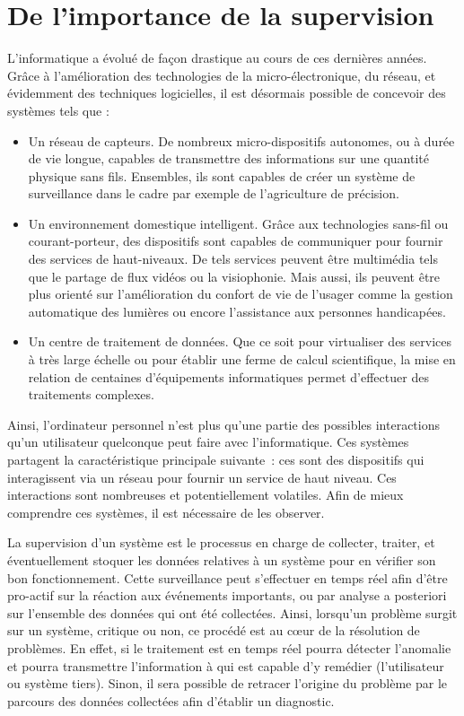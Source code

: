 \section{De l'importance de la supervision}\label{sec:intro:contexte}

L'informatique a évolué de façon drastique au cours de ces dernières années. Grâce à l'amélioration des technologies de la micro-électronique, du réseau, et évidemment des techniques logicielles, il est désormais possible de concevoir des systèmes tels que :
\begin{itemize}
 \item Un réseau de capteurs. De nombreux micro-dispositifs autonomes, ou à durée de vie longue, capables de transmettre des informations sur une quantité physique sans fils. Ensembles, ils sont capables de créer un système de surveillance dans le cadre par exemple de l'agriculture de précision.
 \item Un environnement domestique intelligent. Grâce aux technologies sans-fil ou courant-porteur, des dispositifs sont capables de communiquer pour fournir des services de haut-niveaux. De tels services peuvent être  multimédia tels que le partage de flux vidéos ou la visiophonie. Mais aussi, ils peuvent être plus orienté sur l'amélioration du confort de vie de l'usager comme la gestion automatique des lumières ou encore l'assistance aux personnes handicapées.
 \item Un centre de traitement de données. Que ce soit pour virtualiser des services à très large échelle ou pour établir une ferme de calcul scientifique, la mise en relation de centaines d'équipements informatiques permet d'effectuer des traitements complexes.
\end{itemize}

Ainsi, l'ordinateur personnel n'est plus qu'une partie des possibles interactions qu'un utilisateur quelconque peut faire avec l'informatique. Ces systèmes partagent la caractéristique principale suivante~: ces sont des dispositifs qui interagissent via un réseau pour fournir un service de haut niveau. Ces interactions sont nombreuses et potentiellement volatiles. Afin de mieux comprendre ces systèmes, il est nécessaire de les observer.

La supervision d'un système est le processus en charge de collecter, traiter, et éventuellement stoquer les données relatives à un système pour en vérifier son bon fonctionnement. Cette surveillance peut s'effectuer en temps réel afin d'être pro-actif sur la réaction aux événements importants, ou par analyse a posteriori sur l'ensemble des données qui ont été collectées. Ainsi, lorsqu'un problème surgit sur un système, critique ou non, ce procédé est au cœur de la résolution de problèmes. En effet, si le traitement est en temps réel pourra détecter l'anomalie et pourra transmettre l'information à qui est capable d'y remédier (l'utilisateur ou système tiers). Sinon, il sera possible de retracer l'origine du problème par le parcours des données collectées afin d'établir un diagnostic.

